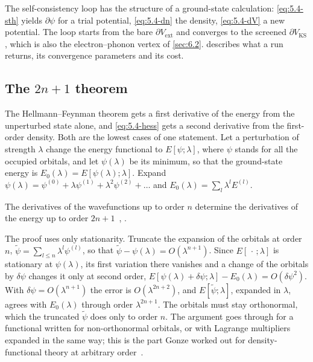 The self-consistency loop has the structure of a ground-state calculation: \cref{eq:5.4-sth} yields $\partial\psi$ for a trial potential, \cref{eq:5.4-dn} the density, \cref{eq:5.4-dV} a new potential. The loop starts from the bare $\partial V_{\mathrm{ext}}$ and converges to the screened $\partial V_{\mathrm{KS}}$, which is also the electron--phonon vertex of \cref{sec:6.2}.  describes what a run returns, its convergence parameters and its cost.

\subsection{The \texorpdfstring{$2n+1$}{2n+1} theorem}

The Hellmann--Feynman theorem gets a first derivative of the energy from the unperturbed state alone, and \cref{eq:5.4-hess} gets a second derivative from the first-order density. Both are the lowest cases of one statement. Let a perturbation of strength $\lambda$ change the energy functional to $E[\psi;\lambda]$, where $\psi$ stands for all the occupied orbitals, and let $\psi(\lambda)$ be its minimum, so that the ground-state energy is $E_0(\lambda) = E[\psi(\lambda);\lambda]$. Expand $\psi(\lambda) = \psi^{(0)} + \lambda\psi^{(1)} + \lambda^2\psi^{(2)} + \dots$ and $E_0(\lambda) = \sum_l\lambda^lE^{(l)}$.
\begin{keyresult}[$2n+1$ theorem]
The derivatives of the wavefunctions up to order $n$ determine the derivatives of the energy up to order $2n+1$~\cite{gonze1995perturbation,gonze1995adiabatic}, \cite[Sect.~II.F.1]{baroni2001phonons}.
\end{keyresult}
The proof uses only stationarity. Truncate the expansion of the orbitals at order $n$, $\tilde\psi = \sum_{l\le n}\lambda^l\psi^{(l)}$, so that $\tilde\psi - \psi(\lambda) = O(\lambda^{n+1})$. Since $E[\,\cdot\,;\lambda]$ is stationary at $\psi(\lambda)$, its first variation there vanishes and a change of the orbitals by $\delta\psi$ changes it only at second order, $E[\psi(\lambda) + \delta\psi;\lambda] - E_0(\lambda) = O(\delta\psi^2)$. With $\delta\psi = O(\lambda^{n+1})$ the error is $O(\lambda^{2n+2})$, and $E[\tilde\psi;\lambda]$, expanded in $\lambda$, agrees with $E_0(\lambda)$ through order $\lambda^{2n+1}$. The orbitals must stay orthonormal, which the truncated $\tilde\psi$ does only to order $n$. The argument goes through for a functional written for non-orthonormal orbitals, or with Lagrange multipliers expanded in the same way; this is the part Gonze worked out for density-functional theory at arbitrary order~\cite{gonze1995perturbation}.

